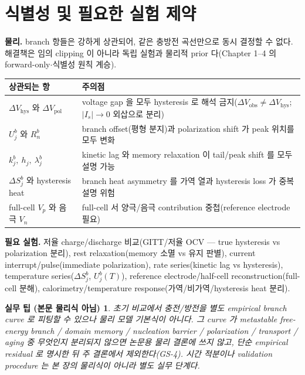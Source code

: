 \documentclass[11pt,a4paper]{article}
\newtheorem*{practicebox}{실무 팁 (본문 물리식 아님)}
\newcommand{\hys}{\mathrm{hys}}
\newcommand{\pol}{\mathrm{pol}}
\newcommand{\obs}{\mathrm{obs}}
\begin{document}
\section{식별성 및 필요한 실험 제약}\label{sec:ch5_ident}
\textbf{물리.} branch 항들은 강하게 상관되어, 같은 충방전 곡선만으로 동시 결정할 수 없다. 해결책은 임의
clipping 이 아니라 독립 실험과 물리적 prior 다(Chapter 1--4 의 forward-only$\cdot$식별성 원칙 계승).
\begin{longtable}{p{} >{\raggedright\arraybackslash}p{}}
\toprule 상관되는 항 & 주의점 \\ \midrule \endhead
$\Delta V_\hys$ 와 $\Delta V_\pol$ & voltage gap 을 모두 hysteresis 로 해석 금지($\Delta V_\obs\ne\Delta V_\hys$; $|I_s|\to0$ 외삽으로 분리) \\
$U_j^b$ 와 $R_n^b$ & branch offset(평형 분지)과 polarization shift 가 peak 위치를 모두 변화 \\
$k_j^b,\ h_j,\ \lambda_j^b$ & kinetic lag 와 memory relaxation 이 tail/peak shift 를 모두 설명 가능 \\
$\Delta S_j^b$ 와 hysteresis heat & branch heat asymmetry 를 가역 열과 hysteresis loss 가 중복 설명 위험 \\
full-cell $V_p$ 와 음극 $V_n$ & full-cell 서 양극/음극 contribution 중첩(reference electrode 필요) \\
\bottomrule
\end{longtable}
\textbf{필요 실험.} 저율 charge/discharge 비교(GITT/저율 OCV — true hysteresis vs polarization 분리), rest
relaxation(memory 소멸 vs 유지 판별), current interrupt/pulse(immediate polarization), rate series(kinetic
lag vs hysteresis), temperature series($\Delta S_j^b$, $U_j^b(T)$), reference electrode/half-cell
reconstruction(full-cell 분해), calorimetry/temperature response(가역/비가역/hysteresis heat 분리).
\begin{practicebox}
초기 비교에서 충전/방전을 별도 empirical branch curve 로 피팅할 수 있으나 \emph{물리 모델 기본식이 아니다}.
그 curve 가 metastable free-energy branch / domain memory / nucleation barrier / polarization / transport /
aging 중 무엇인지 분리되지 않으면 논문용 물리 결론에 쓰지 않고, 단순 empirical residual 로 명시한 뒤 주 결론에서
제외한다(GS-4). 시간 적분이나 validation procedure 는 본 장의 물리식이 아니라 별도 실무 단계다.
\end{practicebox}

\end{document}
